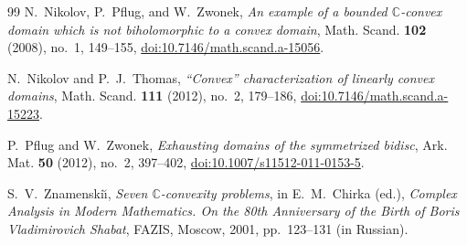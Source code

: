 \documentclass[12pt]{amsart}
\begin{document}
\begin{thebibliography}{99}
N.~Nikolov, P.~Pflug, and W.~Zwonek,
\emph{An example of a bounded $\mathbb C$-convex domain which is not biholomorphic to a convex domain},
Math. Scand. \textbf{102} (2008), no.~1, 149--155,
\href{https://doi.org/10.7146/math.scand.a-15056}{doi:10.7146/math.scand.a-15056}.

N.~Nikolov and P.~J.~Thomas,
\emph{``Convex'' characterization of linearly convex domains},
Math. Scand. \textbf{111} (2012), no.~2, 179--186,
\href{https://doi.org/10.7146/math.scand.a-15223}{doi:10.7146/math.scand.a-15223}.

P.~Pflug and W.~Zwonek,
\emph{Exhausting domains of the symmetrized bidisc},
Ark. Mat. \textbf{50} (2012), no.~2, 397--402,
\href{https://doi.org/10.1007/s11512-011-0153-5}{doi:10.1007/s11512-011-0153-5}.

S.~V.~Znamenski\u{\i},
\emph{Seven $\mathbb C$-convexity problems},
in E.~M.~Chirka (ed.),
\emph{Complex Analysis in Modern Mathematics. On the 80th Anniversary of the Birth of Boris Vladimirovich Shabat},
FAZIS, Moscow, 2001, pp.~123--131 (in Russian).

\end{thebibliography}
\end{document}
